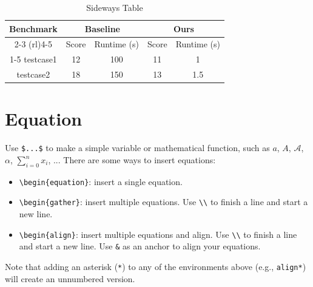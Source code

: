 \begin{table}
    \centering
    \caption{Sideways Table}
    \begin{tabular}{@{}ccccc@{}}
    \toprule
    \multirow{2}{*}{Benchmark} & \multicolumn{2}{c}{Baseline} & \multicolumn{2}{c}{Ours} \\ \cmidrule(rl){2-3} \cmidrule(rl){4-5} 
                               & Score      & Runtime (s)     & Score    & Runtime (s)   \\ \cmidrule(){1-5}
    testcase1                  & 12         & 100             & 11       & 1             \\
    testcase2                  & 18         & 150             & 13       & 1.5           \\ \bottomrule
    \end{tabular}
    \label{tab:sideways}
\end{table}

\newpage
\section{Equation}
Use \verb|$...$| to make a simple variable or mathematical function, such as $a$, $A$, $\mathcal{A}$, $\alpha$, $\sum_{i=0}^{n}x_i$, ... There are some ways to insert equations:
\begin{itemize}
    \item \verb|\begin{equation}|: insert a single equation.
    \item \verb|\begin{gather}|: insert multiple equations. Use \verb|\\| to finish a line and start a new line.
    \item \verb|\begin{align}|: insert multiple equations and align. Use \verb|\\| to finish a line and start a new line. Use \verb|&| as an anchor to align your equations.
\end{itemize}
Note that adding an asterisk (\verb|*|) to any of the environments above (e.g., \verb|align*|) will create an unnumbered version.

